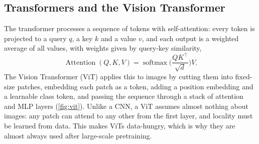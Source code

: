 \subsection{Transformers and the Vision Transformer}
The transformer \cite{vaswani2017attention} processes a sequence of tokens with self-attention: every token is projected to a query $q$, a key $k$ and a value $v$, and each output is a weighted average of all values, with weights given by query-key similarity,
\begin{equation}
  \operatorname{Attention}(Q,K,V)=\operatorname{softmax}\!\Big(\frac{QK^\top}{\sqrt{d}}\Big)V .
\end{equation}
The Vision Transformer (ViT) \cite{dosovitskiy2021vit} applies this to images by cutting them into fixed-size patches, embedding each patch as a token, adding a position embedding and a learnable class token, and passing the sequence through a stack of attention and MLP layers (\cref{fig:vit}). Unlike a CNN, a ViT assumes almost nothing about images: any patch can attend to any other from the first layer, and locality must be learned from data. This makes ViTs data-hungry, which is why they are almost always used after large-scale pretraining.

